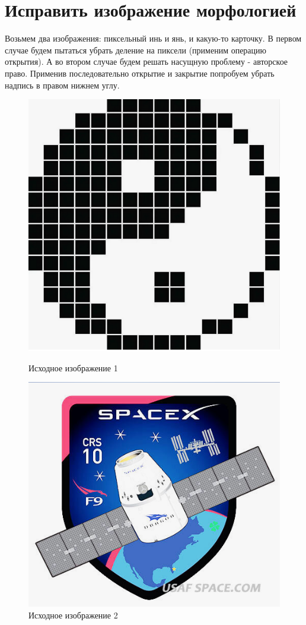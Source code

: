 \section{Исправить изображение морфологией}
\noindent Возьмем два изображения: пиксельный инь и янь, и какую-то карточку. В первом случае будем пытаться убрать деление на пиксели (применим операцию открытия). А во втором случае будем решать насущную проблему - авторское право. Применив последовательно открытие и закрытие попробуем убрать надпись в правом нижнем углу.

\begin{figure}[!htb]
    \includegraphics[width=\linewidth]{../img/original/1.png}
    \caption{Исходное изображение 1}
    \endminipage\hfill
    \includegraphics[width=\linewidth]{../img/original/2.png}
    \caption{Исходное изображение 2}
    \endminipage\hfill
\end{figure}

